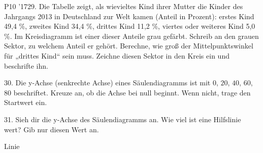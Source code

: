 \documentclass[11pt]{article}
\begin{document}
\pfgruppe{}
\begin{pfaufg}{P10 ’17}{29.}{}
Die Tabelle zeigt, als wievieltes Kind ihrer Mutter die Kinder des Jahrgangs 2013 in Deutschland zur Welt kamen (Anteil in Prozent): erstes Kind 49,4 \%, zweites Kind 34,4 \%, drittes Kind 11,2 \%, viertes oder weiteres Kind 5,0 \%. Im Kreisdiagramm ist einer dieser Anteile grau gefärbt. Schreib an den grauen Sektor, zu welchem Anteil er gehört. Berechne, wie groß der Mittelpunktswinkel für „drittes Kind“ sein muss. Zeichne diesen Sektor in den Kreis ein und beschrifte ihn.
\par\smallskip\noindent {}\par
{}
\end{pfaufg}
\pfgruppe{}
\begin{pfaufg}{}{30.}{}
Die y-Achse (senkrechte Achse) eines Säulendiagramms ist mit $0$, $20$, $40$, $60$, $80$ beschriftet. Kreuze an, ob die Achse bei null beginnt. Wenn nicht, trage den Startwert ein.
\end{pfaufg}
\begin{pfaufg}{}{31.}{}
Sieh dir die y-Achse des Säulendiagramms an. Wie viel ist eine Hilfslinie wert? Gib nur diesen Wert an.
\par\smallskip\noindent {}\par
\par\noindent \leerfeld[je]  Linie\par
{}
\end{pfaufg}
\pfgruppe{}
\end{document}
